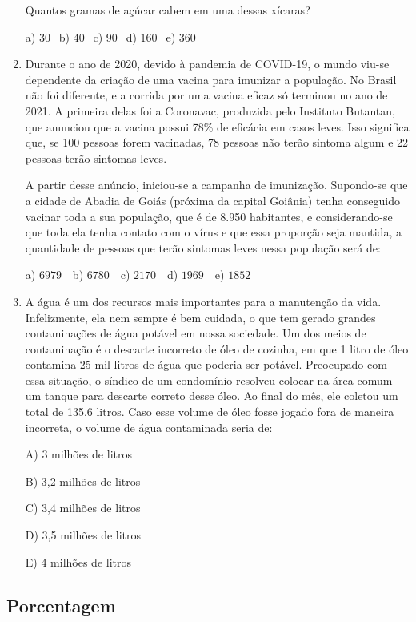 \begin{multicols*}{2}
\begin{enumerate}
Quantos gramas de açúcar cabem em uma dessas xícaras?

	a) $30 \ \ $ b) $40 \ \ $ c) $90 \ \ $ d) $160 \ \ $ e) $360 \ \ $

		\item Durante o ano de 2020, devido à pandemia de COVID-19, o mundo viu-se dependente da criação de uma vacina para imunizar a população. No Brasil não foi diferente, e a corrida por uma vacina eficaz só terminou no ano de 2021. A primeira delas foi a Coronavac, produzida pelo Instituto Butantan, que anunciou que a vacina possui 78\% de eficácia em casos leves. Isso significa que, se 100 pessoas forem vacinadas, 78 pessoas não terão sintoma algum e 22 pessoas terão sintomas leves.

A partir desse anúncio, iniciou-se a campanha de imunização. Supondo-se que a cidade de Abadia de Goiás (próxima da capital Goiânia) tenha conseguido vacinar toda a sua população, que é de 8.950 habitantes, e considerando-se que toda ela tenha contato com o vírus e que essa proporção seja mantida, a quantidade de pessoas que terão sintomas leves nessa população será de:

	a) $6979 \ \ \ $ b) $6780 \ \ \ $ c) $2170 \ \ \ $ d) $1969 \ \ \ $ e) $1852 \ \ $

		\item A água é um dos recursos mais importantes para a manutenção da vida. Infelizmente, ela nem sempre é bem cuidada, o que tem gerado grandes contaminações de água potável em nossa sociedade. Um dos meios de contaminação é o descarte incorreto de óleo de cozinha, em que 1 litro de óleo contamina 25 mil litros de água que poderia ser potável. Preocupado com essa situação, o síndico de um condomínio resolveu colocar na área comum um tanque para descarte correto desse  óleo. Ao final do mês, ele coletou um total de 135,6 litros. Caso esse volume de óleo fosse jogado fora de maneira incorreta, o volume de água contaminada seria de:

A) 3 milhões de litros

B) 3,2 milhões de litros

C) 3,4 milhões de litros

D) 3,5 milhões de litros

E) 4 milhões de litros
		
		\end{enumerate}

	\subsection*{Porcentagem}
	

\end{multicols*}
